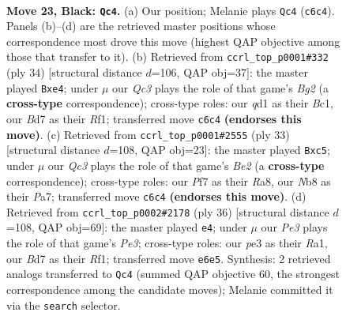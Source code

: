 \documentclass[11pt]{article}
\begin{document}
\begin{figure}[p]\centering
\begin{subfigure}{0.46\textwidth}\centering
\resizebox{\linewidth}{!}{%
\newchessgame
\chessboard[
  setfen={1nr5/rp1bbpk1/p1q1pN2/B5p1/4B2N/4P3/PP3PPP/R2QR1K1 b - - 2 23},
  showmover=false,
  pgfstyle=straightmove, color=movearrow, markmove={c6-c4}
]}
\caption{}
\end{subfigure}\hfill
\begin{subfigure}{0.46\textwidth}\centering
\resizebox{\linewidth}{!}{%
\newchessgame
\chessboard[
  setfen={r2q1rk1/pp3pbp/6p1/2pPn3/PnN1b3/1Q4PP/1P3PB1/R1B2RK1 w - - 0 18},
  showmover=false,
  pgfstyle=straightmove, color=movearrow, markmove={g2-e4}
]}
\caption{}
\end{subfigure}
\\[4pt]
\begin{subfigure}{0.46\textwidth}\centering
\resizebox{\linewidth}{!}{%
\newchessgame
\chessboard[
  setfen={r1q2rk1/pp1Qbppp/2n3b1/2N1p3/2P3P1/4BB1P/PP3P2/R4RK1 b - - 4 17},
  showmover=false,
  pgfstyle=straightmove, color=movearrow, markmove={e7-c5}
]}
\caption{}
\end{subfigure}\hfill
\begin{subfigure}{0.46\textwidth}\centering
\resizebox{\linewidth}{!}{%
\newchessgame
\chessboard[
  setfen={r3qrk1/p4ppp/8/3pNb2/5B2/2PQPPn1/P5PP/R4RK1 w - - 1 19},
  showmover=false,
  pgfstyle=straightmove, color=movearrow, markmove={e3-e4}
]}
\caption{}
\end{subfigure}
\caption{\textbf{Move 23, Black: \texttt{Qc4}.} (a) Our position; Melanie plays \texttt{Qc4} (\texttt{c6c4}). Panels (b)--(d) are the retrieved master positions whose correspondence most drove this move (highest QAP objective among those that transfer to it). (b) Retrieved from \texttt{ccrl\_top\_p0001\#332} (ply 34) [structural distance $d$=106, QAP obj=37]: the master played \texttt{Bxe4}; under $\mu$ our \emph{Qc3} plays the role of that game's \emph{Bg2} (a \textbf{cross-type} correspondence); cross-type roles: our \emph{q}d1 as their \emph{B}c1, our \emph{B}d7 as their \emph{R}f1; transferred move \texttt{c6c4} \textbf{(endorses this move)}. (c) Retrieved from \texttt{ccrl\_top\_p0001\#2555} (ply 33) [structural distance $d$=108, QAP obj=23]: the master played \texttt{Bxc5}; under $\mu$ our \emph{Qc3} plays the role of that game's \emph{Be2} (a \textbf{cross-type} correspondence); cross-type roles: our \emph{P}f7 as their \emph{R}a8, our \emph{N}b8 as their \emph{P}a7; transferred move \texttt{c6c4} \textbf{(endorses this move)}. (d) Retrieved from \texttt{ccrl\_top\_p0002\#2178} (ply 36) [structural distance $d$=108, QAP obj=69]: the master played \texttt{e4}; under $\mu$ our \emph{Pe3} plays the role of that game's \emph{Pe3}; cross-type roles: our \emph{p}e3 as their \emph{R}a1, our \emph{B}d7 as their \emph{R}f1; transferred move \texttt{e6e5}. Synthesis: 2 retrieved analogs transferred to \texttt{Qc4} (summed QAP objective 60, the strongest correspondence among the candidate moves); Melanie committed it via the \texttt{search} selector.}
\label{fig:thought-m45}
\end{figure}
\end{document}
